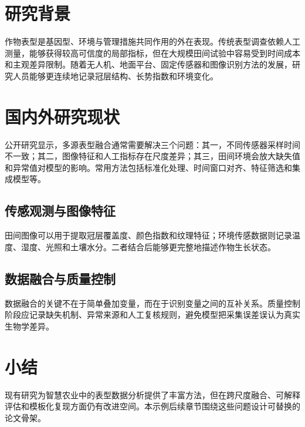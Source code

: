 
\section{研究背景}

作物表型是基因型、环境与管理措施共同作用的外在表现。传统表型调查依赖人工测量，能够获得较高可信度的局部指标，但在大规模田间试验中容易受到时间成本和主观差异限制。随着无人机、地面平台、固定传感器和图像识别方法的发展，研究人员能够更连续地记录冠层结构、长势指数和环境变化。

\section{国内外研究现状}

公开研究显示，多源表型融合通常需要解决三个问题：其一，不同传感器采样时间不一致；其二，图像特征和人工指标存在尺度差异；其三，田间环境会放大缺失值和异常值对模型的影响。常用方法包括标准化处理、时间窗口对齐、特征筛选和集成模型等。

\subsection{传感观测与图像特征}

田间图像可以用于提取冠层覆盖度、颜色指数和纹理特征；环境传感数据则记录温度、湿度、光照和土壤水分。二者结合后能够更完整地描述作物生长状态。

\subsection{数据融合与质量控制}

数据融合的关键不在于简单叠加变量，而在于识别变量之间的互补关系。质量控制阶段应记录缺失机制、异常来源和人工复核规则，避免模型把采集误差误认为真实生物学差异。

\section{小结}

现有研究为智慧农业中的表型数据分析提供了丰富方法，但在跨尺度融合、可解释评估和模板化复现方面仍有改进空间。本示例后续章节围绕这些问题设计可替换的论文骨架。
